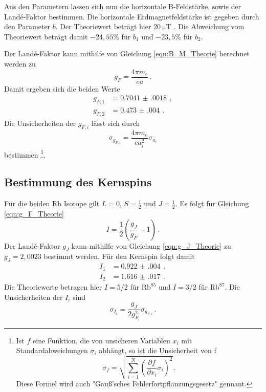 Aus den Parametern lassen sich nun die horizontale B-Feldstärke, sowie der Landé-Faktor bestimmen.
Die horizontale Erdmagnetfeldstärke ist gegeben durch den Parameter $b$. Der Theoriewert beträgt hier
$\SI{20}{\micro\tesla}$ \cite{erde}. Die Abweichung vom Theoriewert beträgt damit $-24{,}55\%$ für
$b_1$ und $-23{,}5\%$ für $b_2$.

Der Landé-Faktor kann mithilfe von Gleichung \eqref{eqn:B_M_Theorie} berechnet werden zu
\begin{equation*}
  g_F=\frac{4\pi m_e}{e a} \,.
\end{equation*}
Damit ergeben sich die beiden Werte
\begin{align*}
  g_{F,1}&= \SI{0.7041(0018)}{}\,,\\
  g_{F,2}&= \SI{0.473(004)}{}\,.
\end{align*}
Die Unsicherheiten der $g_{F,i}$ lässt sich durch
\begin{equation}
  \sigma_{g_{F,i}} = \frac{4\pi m_e}{e a_i^2} \sigma_{a_i}
  \label{eqn:sigma_g_F}
\end{equation}
bestimmen \footnote{Ist $f$ eine Funktion, die von unsicheren Variablen $x_i$ mit
Standardabweichungen $\sigma_i$ abhängt, so ist die Unsicherheit von f
\begin{equation}
  \sigma_f = \sqrt{
    \sum\limits_{i = 1}^N
      \left( \frac{\partial f}{\partial x_i} \sigma_i \right)^{\!\! 2}
  }\,.
  \label{eqn:gaussfehler}
\end{equation}
Diese Formel wird auch "Gauß'sches Fehlerfortpflanzungsgesetz" gennant.}.

\subsection{Bestimmung des Kernspins}
\label{subsec:Kernspin}

Für die beiden Rb Isotope gilt $L=0$, $S=\frac{1}{2}$ und $J=\frac{1}{2}$.
Es folgt für Gleichung \eqref{eqn:g_F_Theorie}
\begin{equation*}
  I=\frac{1}{2}\left(\frac{g_J}{g_F}-1\right) \,.
\end{equation*}
Der Landé-Faktor $g_J$ kann mithilfe von Gleichung \eqref{eqn:g_J_Theorie} zu $g_J=2{,}0023$ bestimmt
werden. Für den Kernspin folgt damit
\begin{align*}
  I_1&= \SI{0.922(004)}{}\,,\\
  I_2&= \SI{1.616(017)}{}\,.
\end{align*}
Die Theoriewerte betragen hier $I=5/2$ für $\text{Rb}^{85}$ und $I=3/2$ für $\text{Rb}^{87}$.
Die Unsicherheiten der $I_i$ sind
\begin{equation}
  \sigma_{I_i} = \frac{g_J}{2 g_{F_i}^2} \sigma_{g_{F,i}}\,.
\end{equation}

